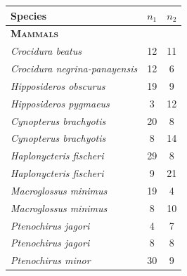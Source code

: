 \begin{frame}[t]
\begin{uncoverenv}
\begin{center}
        \end{center}
    \end{uncoverenv}
\end{frame}


\begin{frame}
\begin{columns}[c]
        \begin{table}%
            \scriptsize
            \addtolength{\tabcolsep}{-0.09cm}
            \centering
            \begin{tabular}{ l c c }
                \textbf{Species} & {\boldmath $n_1$} & {\boldmath $n_2$} \\
                \hline
                \textbf{\textsc{Mammals}} & & \\
                \emph{Crocidura beatus}             & 12 & 11 \\
                \emph{Crocidura negrina-panayensis} & 12 & 6  \\
                \emph{Hipposideros obscurus}        & 19 & 9  \\
                \emph{Hipposideros pygmaeus}        & 3  & 12 \\
                \emph{Cynopterus brachyotis}        & 20 & 8  \\
                \emph{Cynopterus brachyotis}        & 8  & 14 \\
                \emph{Haplonycteris fischeri}       & 29 & 8  \\
                \emph{Haplonycteris fischeri}       & 9  & 21 \\
                \emph{Macroglossus minimus}         & 19 & 4  \\
                \emph{Macroglossus minimus}         & 8  & 10 \\
                \emph{Ptenochirus jagori}           & 4  & 7  \\
                \emph{Ptenochirus jagori}           & 8  & 8  \\
                \emph{Ptenochirus minor}            & 30 & 9  \\

\end{tabular}
\end{table}
\end{columns}
\end{frame}
